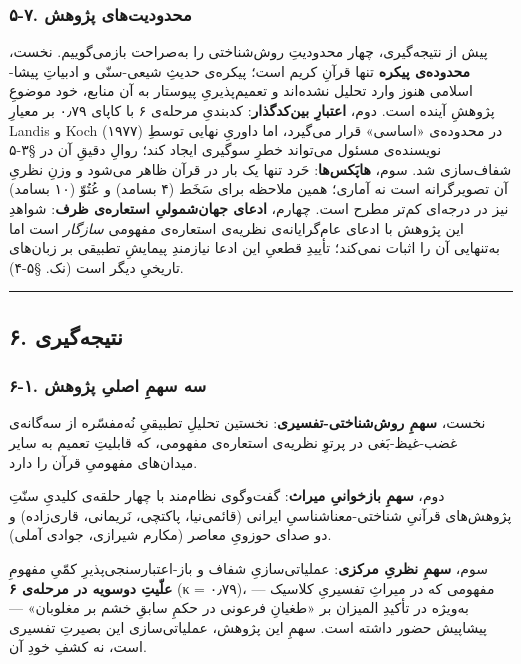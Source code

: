 \begin{RTL}
\begin{otherlanguage}{persian}
\subsubsection{۵-۷. محدودیت‌های
پژوهش}\label{ux645ux62dux62fux648ux62fux6ccux62aux647ux627ux6cc-ux67eux698ux648ux647ux634}

پیش از نتیجه‌گیری، چهار محدودیتِ روش‌شناختی را به‌صراحت بازمی‌گوییم. نخست،
\textbf{محدوده‌ی پیکره} تنها قرآنِ کریم است؛ پیکره‌ی حدیثِ شیعی-سنّی و ادبیاتِ
پیشا-اسلامی هنوز وارد تحلیل نشده‌اند و تعمیم‌پذیریِ پیوستار به آن منابع،
خود موضوعِ پژوهشِ آینده است. دوم، \textbf{اعتبارِ بین‌کدگذار}: کدبندیِ مرحله‌ی
۶ با کاپای ۰٫۷۹ بر معیارِ Landis و Koch (۱۹۷۷) در محدوده‌ی «اساسی» قرار
می‌گیرد، اما داوریِ نهایی توسطِ نویسنده‌ی مسئول می‌تواند خطرِ سوگیری ایجاد
کند؛ روالِ دقیقِ آن در §۳-۵ شفاف‌سازی شد. سوم، \textbf{هاپَکس‌ها}: حَرد تنها
یک بار در قرآن ظاهر می‌شود و وزنِ نظریِ آن تصویرگرانه است نه آماری؛ همین
ملاحظه برای سَخَط (۴ بسامد) و عُتُوّ (۱۰ بسامد) نیز در درجه‌ای کم‌تر مطرح است.
چهارم، \textbf{ادعای جهان‌شمولیِ استعاره‌ی ظرف}: شواهدِ این پژوهش با ادعای
عام‌گرایانه‌ی نظریه‌ی استعاره‌ی مفهومی \emph{سازگار} است اما به‌تنهایی آن را
اثبات نمی‌کند؛ تأییدِ قطعیِ این ادعا نیازمندِ پیمایشِ تطبیقی بر زبان‌های
تاریخیِ دیگر است (نک. §۵-۴).

\begin{center}\rule{0.5\linewidth}{0.5pt}\end{center}

\subsection{۶.
نتیجه‌گیری}\label{ux646ux62aux6ccux62cux647ux6afux6ccux631ux6cc}

\subsubsection{۶-۱. سه سهمِ اصلیِ
پژوهش}\label{ux633ux647-ux633ux647ux645-ux627ux635ux644ux6cc-ux67eux698ux648ux647ux634}

نخست، \textbf{سهمِ روش‌شناختی-تفسیری}: نخستین تحلیلِ تطبیقیِ نُه‌مفسّره از
سه‌گانه‌ی غضب-غیظ-بَغی در پرتوِ نظریه‌ی استعاره‌ی مفهومی، که قابلیتِ تعمیم به
سایر میدان‌های مفهومیِ قرآن را دارد.

دوم، \textbf{سهمِ بازخوانیِ میراث}: گفت‌وگوی نظام‌مند با چهار حلقه‌ی کلیدیِ
سنّتِ پژوهش‌های قرآنیِ شناختی-معناشناسیِ ایرانی (قائمی‌نیا، پاکتچی، نَریمانی،
قاری‌زاده) و دو صدای حوزویِ معاصر (مکارم شیرازی، جوادی آملی).

سوم، \textbf{سهمِ نظریِ مرکزی}: عملیاتی‌سازیِ شفاف و باز-اعتبارسنجی‌پذیرِ کمّیِ
مفهومِ \textbf{علّیتِ دوسویه در مرحله‌ی ۶} (κ = ۰٫۷۹)، مفهومی که در میراثِ
تفسیریِ کلاسیک --- به‌ویژه در تأکیدِ المیزان بر «طغیانِ فرعونی در حکمِ سابقِ
خشم بر مغلوبان» --- پیشاپیش حضور داشته است. سهمِ این پژوهش، عملیاتی‌سازی
این بصیرتِ تفسیری است، نه کشفِ خودِ آن.


\end{otherlanguage}
\end{RTL}
